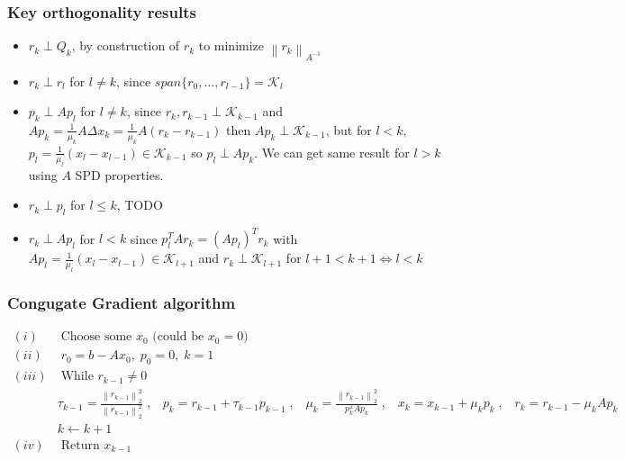 \documentclass{article}
\newcommand{\norm}[2]{\left\lVert#1\right\rVert_#2}
\begin{document}
\subsubsection{Key orthogonality results}
\begin{itemize}
    \item $r_k \perp Q_k$, by construction of $r_k$ to minimize $\norm{r_k}{{A^{-1}}}$
    \item $r_k \perp r_l$ for $l \neq k$, since $span\{r_0, \dots, r_{l-1}\} = \mathcal{K}_l$
    \item $p_k \perp Ap_l$ for $l \neq k$, since $r_k, r_{k-1} \perp \mathcal{K}_{k-1}$ and $Ap_k = \frac{1}{\mu_k}A\Delta x_k = \frac{1}{\mu_k}A(r_k - r_{k-1})$ then $Ap_k \perp \mathcal{K}_{k-1}$, but for $l < k$, $p_l = \frac{1}{\mu_l}(x_l - x_{l-1}) \in \mathcal{K}_{k-1}$ so $p_l \perp Ap_k$. We can get same result for $l>k$ using $A$ SPD properties.
    \item $r_k \perp p_l$ for $l \leq k$, TODO
    \item $r_k \perp Ap_l$ for $l < k$ since $p_l^TAr_k = (Ap_l)^Tr_k$ with $Ap_l = \frac{1}{\mu_l}(x_l - x_{l-1}) \in \mathcal{K}_{l+1}$ and $r_k \perp \mathcal{K}_{l+1}$ for $l+1 < k+1 \Leftrightarrow l < k$
\end{itemize}

\subsubsection{Congugate Gradient algorithm}
\begin{align*}
    (i) & \;\textrm{Choose some } x_0 \textrm{ (could be $x_0 = 0$)}\\
    (ii) & \; r_0 = b-Ax_0, \; p_0 = 0, \; k = 1\\
    (iii) & \; \textrm{While } r_{k-1} \neq 0\\
    &\tau_{k-1} = \frac{\norm{r_{k-1}}{2}^2}{\norm{r_{k-1}}{2}^2}\;,\;\;\; p_k = r_{k-1} + \tau_{k-1}p_{k-1}\;, \;\;\; \mu_k = \frac{\norm{r_{k-1}}{2}^2}{p_k^TAp_k}\;, \;\;\; x_k = x_{k-1} + \mu_kp_k\;, \;\;\;r_k = r_{k-1} - \mu_kAp_k\\
    &k \leftarrow k+1\\
    (iv) & \; \textrm{Return } x_{k-1}
\end{align*}
\end{document}

